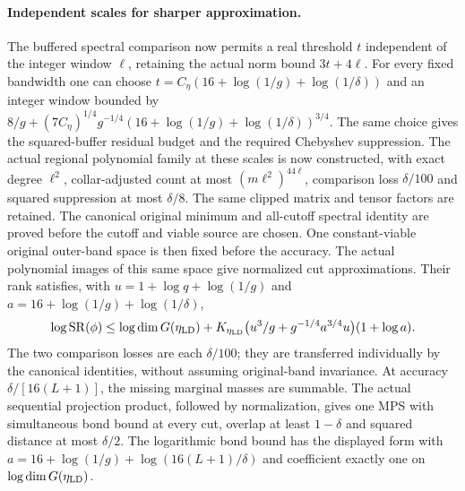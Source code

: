 \documentclass{article}
\begin{document}
\paragraph{Independent scales for sharper approximation.}
The buffered spectral comparison now permits a real threshold $t$ independent
of the integer window $\ell$, retaining the actual norm bound $3t+4\ell$.
For every fixed bandwidth one can choose
$t=C_\eta(16+\log(1/g)+\log(1/\delta))$ and an integer window bounded by
$8/g+(7C_\eta)^{1/4}g^{-1/4}(16+\log(1/g)+\log(1/\delta))^{3/4}$.
The same choice gives the squared-buffer residual budget and the required
Chebyshev suppression. The actual regional polynomial family at these scales is now constructed,
with exact degree $\ell^2$, collar-adjusted count at most
$(m\ell^2)^{44\ell}$, comparison loss $\delta/100$ and squared suppression
at most $\delta/8$. The same clipped matrix and tensor factors are retained.
The canonical original minimum and all-cutoff spectral identity are proved
before the cutoff and viable source are chosen. One constant-viable original
outer-band space is then fixed before the accuracy. The actual polynomial
images of this same space give normalized cut approximations. Their rank
satisfies, with $u=1+\log q+\log(1/g)$ and
$a=16+\log(1/g)+\log(1/\delta)$,
\begin{align}
 \log\operatorname{SR}(\phi)
 \le\log\dim G(\eta_{\rm LD})+
 K_{\eta_{\rm LD}}\bigl(u^3/g+g^{-1/4}a^{3/4}u\bigr)(1+\log a).
    \label{eq:ld_scope_schmidt_rank_bound}
\end{align}
The two comparison losses are each $\delta/100$; they are transferred
individually by the canonical identities, without assuming original-band
invariance. At accuracy $\delta/[16(L+1)]$, the missing marginal masses
are summable. The actual sequential projection product, followed by
normalization, gives one MPS with simultaneous bond bound at every cut,
overlap at least $1-\delta$ and squared distance at most $\delta/2$.
The logarithmic bond bound has the displayed form with
$a=16+\log(1/g)+\log(16(L+1)/\delta)$ and coefficient exactly one
on $\log\dim G(\eta_{\rm LD})$.
\end{document}
